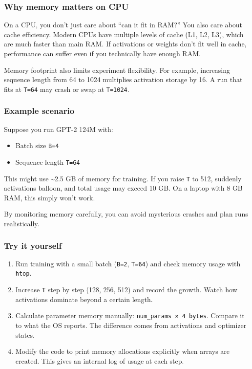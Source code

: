 \documentclass[
  letterpaper,
  DIV=11,
  numbers=noendperiod]{scrreprt}
\providecommand{\tightlist}{%
  \setlength{\itemsep}{0pt}\setlength{\parskip}{0pt}}
\begin{document}
\subsubsection{Why memory matters on
CPU}\label{why-memory-matters-on-cpu}

On a CPU, you don't just care about ``can it fit in RAM?'' You also care
about cache efficiency. Modern CPUs have multiple levels of cache (L1,
L2, L3), which are much faster than main RAM. If activations or weights
don't fit well in cache, performance can suffer even if you technically
have enough RAM.

Memory footprint also limits experiment flexibility. For example,
increasing sequence length from 64 to 1024 multiplies activation storage
by 16. A run that fits at \texttt{T=64} may crash or swap at
\texttt{T=1024}.

\subsubsection{Example scenario}\label{example-scenario}

Suppose you run GPT-2 124M with:

\begin{itemize}
\tightlist
\item
  Batch size \texttt{B=4}
\item
  Sequence length \texttt{T=64}
\end{itemize}

This might use \textasciitilde2.5 GB of memory for training. If you
raise \texttt{T} to 512, suddenly activations balloon, and total usage
may exceed 10 GB. On a laptop with 8 GB RAM, this simply won't work.

By monitoring memory carefully, you can avoid mysterious crashes and
plan runs realistically.

\subsubsection{Try it yourself}\label{try-it-yourself-44}

\begin{enumerate}
\def\labelenumi{\arabic{enumi}.}
\tightlist
\item
  Run training with a small batch (\texttt{B=2}, \texttt{T=64}) and
  check memory usage with \texttt{htop}.
\item
  Increase \texttt{T} step by step (128, 256, 512) and record the
  growth. Watch how activations dominate beyond a certain length.
\item
  Calculate parameter memory manually:
  \texttt{num\_params\ ×\ 4\ bytes}. Compare it to what the OS reports.
  The difference comes from activations and optimizer states.
\item
  Modify the code to print memory allocations explicitly when arrays are
  created. This gives an internal log of usage at each step.
\end{enumerate}
\end{document}
